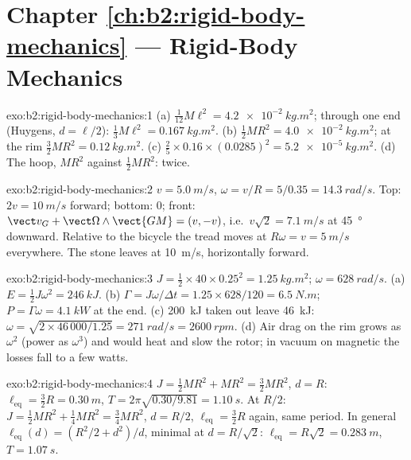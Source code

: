 \section*{Chapter \ref{ch:b2:rigid-body-mechanics} --- Rigid-Body Mechanics}

\begin{solution}{exo:b2:rigid-body-mechanics:1}
(a) $\tfrac1{12}M\ell^2 = \qty{4.2e-2}{kg.m^2}$; through one end (Huygens,
$d = \ell/2$): $\tfrac13M\ell^2 = \qty{0.167}{kg.m^2}$. (b) $\tfrac12MR^2 =
\qty{4.0e-2}{kg.m^2}$; at the rim $\tfrac32MR^2 = \qty{0.12}{kg.m^2}$.
(c) $\tfrac25 \times 0.16 \times (0.0285)^2 = \qty{5.2e-5}{kg.m^2}$. (d) The
hoop, $MR^2$ against $\tfrac12MR^2$: twice.
\end{solution}

\begin{solution}{exo:b2:rigid-body-mechanics:2}
$v = \qty{5.0}{m/s}$, $\omega = v/R = 5/0.35 = \qty{14.3}{rad/s}$. Top:
$2v = \qty{10}{m/s}$ forward; bottom: $0$; front: $\vect v_G + \vect\Omega
\wedge\vect{GM} = (v, -v)$, i.e.\ $v\sqrt2 = \qty{7.1}{m/s}$ at
\qty{45}{\degree} downward. Relative to the bicycle the tread moves at
$R\omega = v = \qty{5}{m/s}$ everywhere. The stone leaves at \qty{10}{m/s},
horizontally forward.
\end{solution}

\begin{solution}{exo:b2:rigid-body-mechanics:3}
$J = \tfrac12 \times 40 \times 0.25^2 = \qty{1.25}{kg.m^2}$; $\omega = \qty{628}{rad/s}$.
(a) $E = \tfrac12J\omega^2 = \qty{246}{kJ}$. (b) $\Gamma = J\omega/\Delta t =
1.25 \times 628/120 = \qty{6.5}{N.m}$; $P = \Gamma\omega = \qty{4.1}{kW}$ at the end.
(c) \qty{200}{kJ} taken out leave \qty{46}{kJ}: $\omega = \sqrt{2 \times 46\,000/1.25}
= \qty{271}{rad/s} = \qty{2600}{rpm}$. (d) Air drag on the rim grows as
$\omega^2$ (power as $\omega^3$) and would heat and slow the rotor; in
vacuum on magnetic  the losses fall to a few watts.
\end{solution}

\begin{solution}{exo:b2:rigid-body-mechanics:4}
$J = \tfrac12MR^2 + MR^2 = \tfrac32MR^2$, $d = R$: $\ell_{\text{eq}} = \tfrac32R
= \qty{0.30}{m}$, $T = 2\pi\sqrt{0.30/9.81} = \qty{1.10}{s}$. At $R/2$: $J =
\tfrac12MR^2 + \tfrac14MR^2 = \tfrac34MR^2$, $d = R/2$, $\ell_{\text{eq}} =
\tfrac32R$ again, same period. In general $\ell_{\text{eq}}(d) = (R^2/2 +
d^2)/d$, minimal at $d = R/\sqrt2$: $\ell_{\text{eq}} = R\sqrt2 = \qty{0.283}{m}$,
$T = \qty{1.07}{s}$.
\end{solution}

